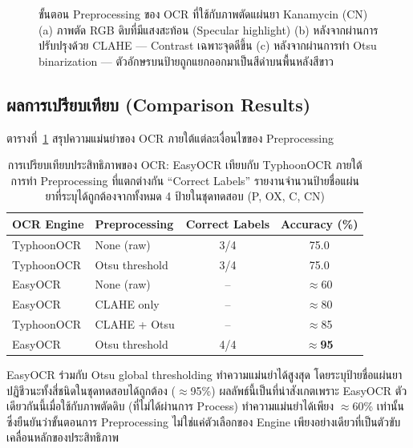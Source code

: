 \begin{figure}[H]
  \centering
  \caption{ขั้นตอน Preprocessing ของ OCR ที่ใช้กับภาพตัดแผ่นยา Kanamycin (CN)
           (a) ภาพตัด RGB ดิบที่มีแสงสะท้อน (Specular highlight)
           (b) หลังจากผ่านการปรับปรุงด้วย CLAHE --- Contrast เฉพาะจุดดีขึ้น
           (c) หลังจากผ่านการทำ Otsu binarization --- ตัวอักษรบนป้ายถูกแยกออกมาเป็นสีดำบนพื้นหลังสีขาว}
  \label{fig:ocr_pipeline}
\end{figure}

\subsection{ผลการเปรียบเทียบ (Comparison Results)}

ตารางที่~\ref{tab:ocr_comparison} สรุปความแม่นยำของ OCR ภายใต้แต่ละเงื่อนไขของ Preprocessing

\begin{table}[H]
  \centering
  \caption{การเปรียบเทียบประสิทธิภาพของ OCR: EasyOCR เทียบกับ TyphoonOCR ภายใต้การทำ Preprocessing ที่แตกต่างกัน
           ``Correct Labels'' รายงานจำนวนป้ายชื่อแผ่นยาที่ระบุได้ถูกต้องจากทั้งหมด 4 ป้ายในชุดทดสอบ (P, OX, C, CN)}
  \label{tab:ocr_comparison}
  \begin{tabular}{llcc}
    \toprule
    \textbf{OCR Engine} & \textbf{Preprocessing} & \textbf{Correct Labels} & \textbf{Accuracy (\%)} \\
    \midrule
    TyphoonOCR  & None (raw)       & 3/4 & 75.0 \\
    TyphoonOCR  & Otsu threshold   & 3/4 & 75.0 \\
    EasyOCR     & None (raw)       & --  & $\approx$60 \\
    EasyOCR     & CLAHE only       & --  & $\approx$80 \\
    TyphoonOCR  & CLAHE + Otsu     & --  & $\approx$85 \\
    EasyOCR     & Otsu threshold   & 4/4 & $\approx$\textbf{95} \\
    \bottomrule
  \end{tabular}
\end{table}

EasyOCR ร่วมกับ Otsu global thresholding ทำความแม่นยำได้สูงสุด โดยระบุป้ายชื่อแผ่นยาปฏิชีวนะทั้งสี่ชนิดในชุดทดสอบได้ถูกต้อง ($\approx$95\%)
ผลลัพธ์นี้เป็นที่น่าสังเกตเพราะ EasyOCR ตัวเดียวกันนี้เมื่อใช้กับภาพตัดดิบ (ที่ไม่ได้ผ่านการ Process) ทำความแม่นยำได้เพียง $\approx$60\% เท่านั้น ซึ่งยืนยันว่าขั้นตอนการ Preprocessing ไม่ใช่แค่ตัวเลือกของ Engine เพียงอย่างเดียวที่เป็นตัวขับเคลื่อนหลักของประสิทธิภาพ

